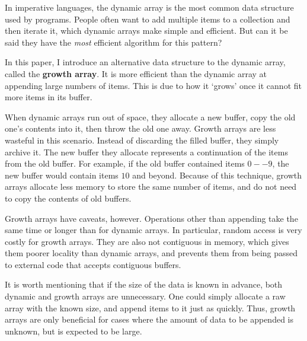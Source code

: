 In imperative languages, the dynamic array is the most common data structure used by programs. People often want to add multiple items to a collection and then iterate it, which dynamic arrays make simple and efficient. But can it be said they have the \textit{most} efficient algorithm for this pattern?

In this paper, I introduce an alternative data structure to the dynamic array, called the \textbf{growth array}. It is more efficient than the dynamic array at appending large numbers of items. This is due to how it `grows' once it cannot fit more items in its buffer.

When dynamic arrays run out of space, they allocate a new buffer, copy the old one's contents into it, then throw the old one away. Growth arrays are less wasteful in this scenario. Instead of discarding the filled buffer, they simply archive it. The new buffer they allocate represents a continuation of the items from the old buffer. For example, if the old buffer contained items $0 -- 9$, the new buffer would contain items $10$ and beyond. Because of this technique, growth arrays allocate less memory to store the same number of items, and do not need to copy the contents of old buffers.

Growth arrays have caveats, however. Operations other than appending take the same time or longer than for dynamic arrays. In particular, random access is very costly for growth arrays. They are also not contiguous in memory, which gives them poorer locality than dynamic arrays, and prevents them from being passed to external code that accepts contiguous buffers.

It is worth mentioning that if the size of the data is known in advance, both dynamic and growth arrays are unnecessary. One could simply allocate a raw array with the known size, and append items to it just as quickly. Thus, growth arrays are only beneficial for cases where the amount of data to be appended is unknown, but is expected to be large.